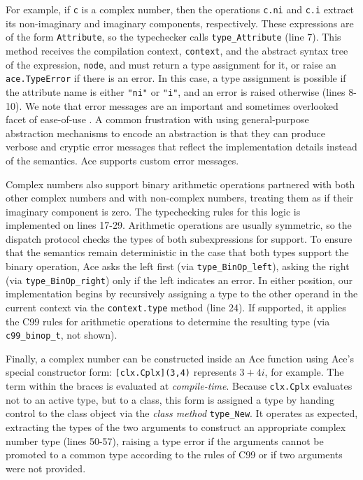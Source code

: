 For example, if \verb|c| is a complex number, then the operations \verb|c.ni| and \verb|c.i| extract its non-imaginary and imaginary components, respectively. These expressions are of the form \verb|Attribute|, so the typechecker calls \verb|type_Attribute| (line 7).
This method receives the compilation context, \verb|context|, and the abstract syntax tree of the expression, \verb|node|, and must return a type assignment for it, or raise an \verb|ace.TypeError| if there is an error. In this case, a type assignment is possible if the attribute name is either \verb|"ni"| or \verb|"i"|, and an error is raised otherwise (lines 8-10). We note that error messages are an important and sometimes overlooked facet of {ease-of-use} \cite{marceau2011measuring}. A common frustration with using general-purpose abstraction mechanisms to encode an abstraction is that they can produce  verbose and cryptic error messages that reflect the implementation details instead of the semantics. Ace supports custom error messages.%

Complex numbers also support binary arithmetic operations partnered with both other complex numbers and with non-complex numbers, treating them as if their imaginary component is zero. The typechecking rules for this logic is implemented on lines 17-29. Arithmetic operations are usually symmetric, so the dispatch protocol checks the types of both subexpressions for support. To ensure that the semantics remain deterministic in the case that both types support the binary operation, Ace asks the left first (via \verb|type_BinOp_left|), asking the right (via \verb|type_BinOp_right|) only if the left indicates an error. In either position, our implementation begins by recursively assigning a type to the other operand in the current context via the \verb|context.type| method (line 24). If supported, it applies the C99 rules for arithmetic operations to determine the resulting type (via \verb|c99_binop_t|, not shown). 

Finally, a complex number can be constructed inside an Ace function using Ace's special constructor form: \verb|[clx.Cplx](3,4)| represents $3+4i$, for example. The term within the braces is evaluated at \emph{compile-time}. Because \verb|clx.Cplx| evaluates not to an active type, but to a class, this form is assigned a type by handing control to the class object via the \emph{class method} \verb|type_New|. It operates as expected, extracting the types of the two arguments to construct an appropriate complex number type (lines 50-57), raising a type error if the arguments cannot be promoted to a common type according to the rules of C99 or if two arguments were not provided.%

